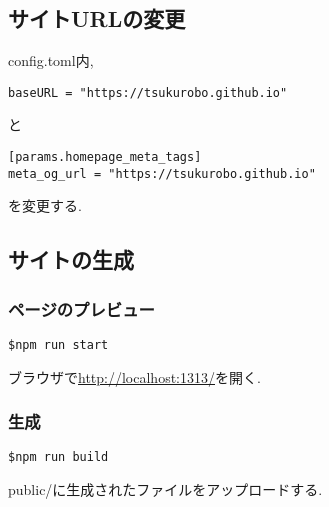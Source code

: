 \subsection{サイトURLの変更}
config.toml内,
\begin{lstlisting}[]
baseURL = "https://tsukurobo.github.io"
\end{lstlisting}
と
\begin{lstlisting}[]
[params.homepage_meta_tags]
meta_og_url = "https://tsukurobo.github.io"
\end{lstlisting}
を変更する.

\subsection{サイトの生成}
\subsubsection{ページのプレビュー}
\begin{lstlisting}[]
  $npm run start
\end{lstlisting}

ブラウザで\url{http://localhost:1313/}を開く.

\subsubsection{生成}
\begin{lstlisting}[]
  $npm run build
\end{lstlisting}

public/に生成されたファイルをアップロードする.